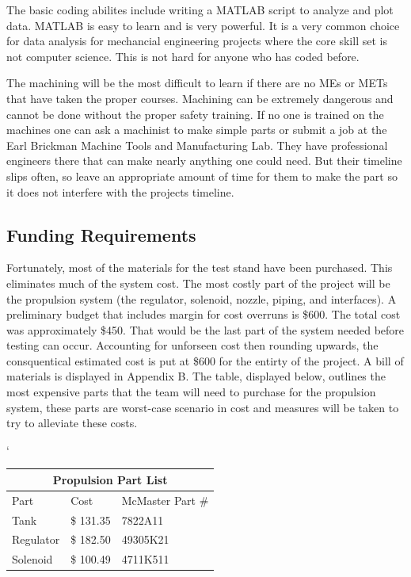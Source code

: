\documentclass[conference]{IEEEtran} %
\begin{document}
The basic coding abilites include writing a MATLAB script to analyze and plot data. MATLAB is easy to learn and is very powerful. It is a very common choice for data analysis for mechancial engineering
projects where the core skill set is not computer science. This is not hard for anyone who has coded before.

The machining will be the most difficult to learn if there are no MEs or METs that have taken the proper courses. Machining can be extremely dangerous and cannot be done
without the proper safety training. If no one is trained on the machines one can ask a machinist to make simple parts or submit a job at the Earl Brickman Machine Tools and Manufacturing Lab.
They have professional engineers there that can make nearly anything one could need. But their timeline slips often, so leave an appropriate amount of time for them to make the part
so it does not interfere with the projects timeline.

\subsection{Funding Requirements}
Fortunately, most of the materials for the test stand have been purchased. This eliminates much of the system cost. The most costly part of the project
will be the propulsion system (the regulator, solenoid, nozzle, piping, and interfaces). A preliminary budget that includes margin for cost overruns is \$600.
The total cost was approximately \$450. That would be the last part of the system needed before testing can occur. Accounting for unforseen cost then rounding upwards,
the consquentical estimated cost is put at \$600 for the entirty of the project. A bill of materials is displayed in Appendix B. The table, displayed below, outlines
the most expensive parts that the team will need to purchase for the propulsion system, these parts are worst-case scenario in cost and measures will be taken to
try to alleviate these costs.

\begin{center}
`\begin{tabular}{ |p{2cm}|p{2cm}|p{2cm}| }
  \hline
  \multicolumn{3}{|c|}{Propulsion Part List} \\
  \hline
  Part & Cost & McMaster Part \# \\
  \hline
  Tank & \$ 131.35 & 7822A11 \\
  \hline
  Regulator & \$ 182.50 & 49305K21 \\
  \hline
  Solenoid & \$ 100.49 & 4711K511 \\
  \hline
 \end{tabular}
\end{center}
\end{document}
